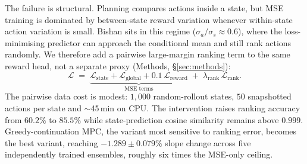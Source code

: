 \documentclass[11pt]{article}
\begin{document}
The failure is structural. Planning compares actions inside a state, but MSE training is dominated by between-state reward variation whenever within-state action variation is small. Bishan sits in this regime ($\sigma_a/\sigma_s \approx 0.6$), where the loss-minimising predictor can approach the conditional mean and still rank actions randomly. We therefore add a pairwise large-margin ranking term \citep{herbrich2000large,joachims2002optimizing,burges2005learning,burges2010ranknet} to the same reward head, not a separate proxy (Methods, \S\ref{sec:methods}):
\begin{equation}
\mathcal{L} \;=\; \underbrace{\mathcal{L}_{\text{state}} + \mathcal{L}_{\text{global}} + 0.1\,\mathcal{L}_{\text{reward}}}_{\text{MSE terms}} \;+\; \lambda_{\text{rank}}\,\mathcal{L}_{\text{rank}}.
\end{equation}
The pairwise data cost is modest: $1{,}000$ random-rollout states, $50$ snapshotted actions per state and $\sim$45\,min on CPU. The intervention raises ranking accuracy from $60.2\%$ to $85.5\%$ while state-prediction cosine similarity remains above $0.999$. Greedy-continuation MPC, the variant most sensitive to ranking error, becomes the best variant, reaching $-1.289 \pm 0.079\%$ slope change across five independently trained ensembles, roughly six times the MSE-only ceiling.
\end{document}

